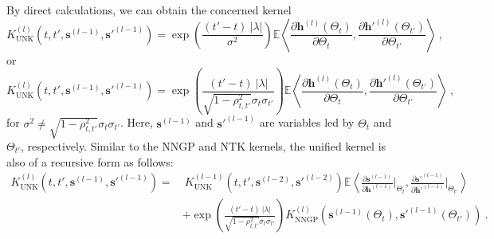 \documentclass[review,10pt]{JMtemplate}
\begin{document}
By direct calculations, we can obtain the concerned kernel
\[
K_{\textrm{UNK}}^{(l)} \left( t, t', \boldsymbol{s}^{(l-1)}, \boldsymbol{s}'^{(l-1)} \right)  = \exp\left( \frac{ (t'-t) ~|\lambda|}{\sigma^2} \right) \mathbb{E} \left\langle \frac{\partial \boldsymbol{h}^{(l)}(\Theta_t)}{\partial \Theta_t} , \frac{\partial \boldsymbol{h}'^{(l)}(\Theta_{t'})}{\partial \Theta_{t'}}  \right\rangle \ ,
\]
or
\[
K_{\textrm{UNK}}^{(l)} \left( t, t', \boldsymbol{s}^{(l-1)}, \boldsymbol{s}'^{(l-1)} \right)  = \exp\left( \frac{ (t'-t) ~|\lambda|}{\sqrt{1-\rho_{t,t'}^2}\sigma_{t}\sigma_{t'}} \right) \mathbb{E} \left\langle \frac{\partial \boldsymbol{h}^{(l)}(\Theta_t)}{\partial \Theta_t} , \frac{\partial \boldsymbol{h}'^{(l)}(\Theta_{t'})}{\partial \Theta_{t'}}  \right\rangle \ , 
\]
for $\sigma^2 \neq \sqrt{1-\rho_{t,t'}^2}\sigma_{t}\sigma_{t'}$. Here, $\boldsymbol{s}^{(l-1)}$ and $\boldsymbol{s}'^{(l-1)}$ are variables led by $\Theta_t$ and $\Theta_{t'}$, respectively. Similar to the NNGP and NTK kernels, the unified kernel is also of a recursive form as follows:
\begin{equation}  \label{eq:recursive_app}
\begin{aligned}
K_{\textrm{UNK}}^{(l)} \left( t, t', \boldsymbol{s}^{(l-1)}, \boldsymbol{s}'^{(l-1)} \right) =&~ K_{\textrm{UNK}}^{(l-1)} \left( t, t',  \boldsymbol{s}^{(l-2)}, \boldsymbol{s}'^{(l-2)} \right) \mathbb{E} \left\langle \frac{\partial \boldsymbol{s}^{(l-1)}}{\partial \boldsymbol{h}^{(l-1)}} \Big|_{\Theta_t},  \frac{\partial \boldsymbol{s}'^{(l-1)}}{\partial \boldsymbol{h}'^{(l-1)}} \Big|_{\Theta_{t'}} \right\rangle \\
&+ \exp\left( \frac{ (t'-t) ~|\lambda|}{ \sqrt{1-\rho_{t,t'}^2}\sigma_{t}\sigma_{t'} } \right) K_{\textrm{NNGP}}^{(l)} \left( \boldsymbol{s}^{(l-1)}(\Theta_t), \boldsymbol{s}'^{(l-1)}(\Theta_{t'}) \right) \ .
\end{aligned} 
\end{equation}
\end{document}
